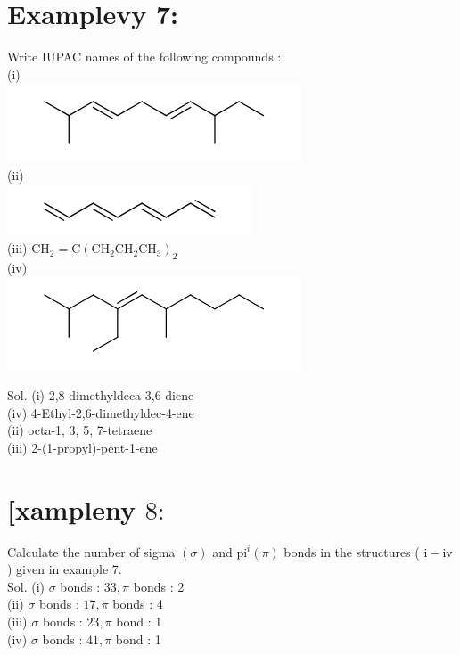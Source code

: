 \documentclass[10pt]{article}
\begin{document}
\section*{Examplevy 7:}
Write IUPAC names of the following compounds :\\
(i)\\
\includegraphics{smile-0babd19ea5f2efe10810217098128636314097f0}\\
(ii)\\
\includegraphics{smile-caec20fe302ceaea419f31bb2b8cb803e8fa0d7f}\\
(iii) $\mathrm{CH}_{2}=\mathrm{C}\left(\mathrm{CH}_{2} \mathrm{CH}_{2} \mathrm{CH}_{3}\right)_{2}$\\
(iv)\\
\includegraphics{smile-bef9dfb4d88477aa2027826e17364a2de130abb0}

Sol. (i) 2,8-dimethyldeca-3,6-diene\\
(iv) 4-Ethyl-2,6-dimethyldec-4-ene\\
(ii) octa-1, 3, 5, 7-tetraene\\
(iii) 2-(1-propyl)-pent-1-ene

\section*{[xampleny $8:$}
Calculate the number of sigma $(\sigma)$ and $\mathrm{pi}^{i}(\pi)$ bonds in the structures ( $\mathrm{i}-\mathrm{iv}$ ) given in example 7.\\
Sol. (i) $\sigma$ bonds : $33, \pi$ bonds : 2\\
(ii) $\sigma$ bonds : $17, \pi$ bonds : 4\\
(iii) $\sigma$ bonds : $23, \pi$ bond : 1\\
(iv) $\sigma$ bonds : $41, \pi$ bond : 1
\end{document}
